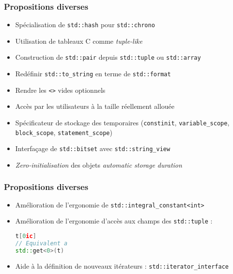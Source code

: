 \documentclass[C++.tex]{subfiles}
\begin{document}
\begin{frame}[fragile]
	\frametitle{Propositions diverses}
	\begin{itemize}
		\item Spécialisation de \lstinline|std::hash| pour \lstinline|std::chrono|
		\item Utilisation de tableaux C comme \textit{tuple-like}


		\item Construction de \lstinline|std::pair| depuis \lstinline|std::tuple| ou \lstinline|std::array|
		\item Redéfinir \lstinline|std::to_string| en terme de \lstinline|std::format|
		\item Rendre les \lstinline|<>| vides optionnels
		\item Accès par les utilisateurs à la taille réellement allouée
		\item Spécificateur de stockage des temporaires (\lstinline|constinit|, \lstinline|variable_scope|, \lstinline|block_scope|, \lstinline|statement_scope|)


		\item Interfaçage de \lstinline|std::bitset| avec \lstinline|std::string_view|
		\item \textit{Zero-initialisation} des objets \og{}\textit{automatic storage duration}\fg{}
		
	\end{itemize}
\end{frame}

\begin{frame}[fragile]
\frametitle{Propositions diverses}
	\begin{itemize}
		\item Amélioration de l'ergonomie de \lstinline|std::integral_constant<int>|
		\item Amélioration de l'ergonomie d'accès aux champs des \lstinline|std::tuple| :
		
		\begin{lstlisting}[language=C++]
t[0ic]
// Equivalent a
std::get<0>(t)\end{lstlisting}
		
		\item Aide à la définition de nouveaux itérateurs : \lstinline|std::iterator_interface|
	\end{itemize}
\end{frame}
				
\end{document}
